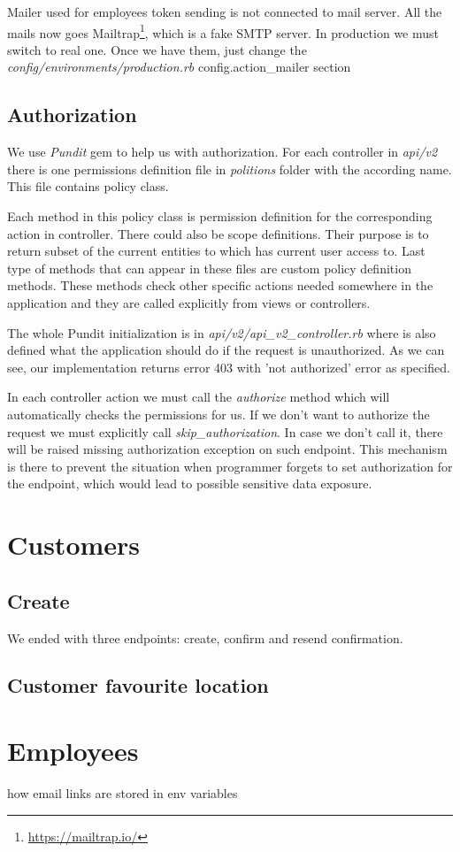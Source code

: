 Mailer used for employees token sending is not connected to mail server. All the mails now goes Mailtrap\footnote{\url{https://mailtrap.io/}}, which is a fake SMTP server. In production we must switch to real one. Once we have them, just change the \textit{config/environments/production.rb} config.action\_mailer section

\subsection {Authorization}
We use \textit{Pundit} gem to help us with authorization. For each controller in \textit{api/v2} there is one permissions definition file in \textit{politions} folder with the according name.  This file contains policy class. 

Each method in this policy class is permission definition for the corresponding action in controller. There could also be scope definitions. Their purpose is to return subset of the current entities to which has current user access to. Last type of methods that can appear in these files are custom policy definition methods. These methods check other specific actions needed somewhere in the application and they are called explicitly from views or controllers.

The whole Pundit initialization is in \textit{api/v2/api\_v2\_controller.rb} where is also defined what the application should do if the request is unauthorized. As we can see, our implementation returns error 403 with 'not authorized' error as specified.

In each controller action we must call the \textit{authorize} method which will automatically checks the permissions for us. If we don't want to authorize the request we must explicitly call \textit{skip\_authorization}. In case we don't call it, there will be raised missing authorization exception on such endpoint. This mechanism is there to prevent the situation when programmer forgets to set authorization for the endpoint, which would lead to possible sensitive data exposure.

\section {Customers}
\subsection{Create}
We ended with three endpoints: create, confirm and resend confirmation. 

\subsection{Customer favourite location}

\section {Employees}
how email links are stored in env variables
